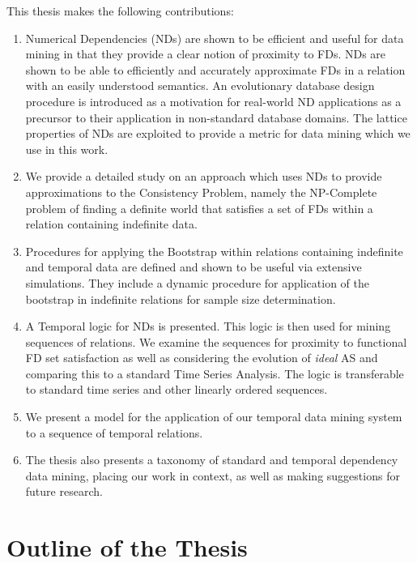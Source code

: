 This thesis makes the following contributions:
\begin{enumerate}
\item Numerical Dependencies (NDs) are shown to be efficient and useful for 
data mining in that they provide a clear notion of proximity to FDs.
NDs are shown to be able to efficiently and accurately approximate FDs
in a relation with an easily understood semantics. 
An evolutionary database design procedure is introduced as a 
motivation for real-world ND applications as a precursor to their application
in non-standard database domains. The lattice properties of NDs are
exploited to provide a metric for data mining which we use in this work. 
\item We provide a detailed study on an approach which uses NDs to
provide approximations to the Consistency Problem, namely the
NP-Complete problem of finding a definite world that satisfies a set
of FDs within a relation containing indefinite data. 
\item Procedures for applying the Bootstrap within relations containing
indefinite and temporal data are defined and shown to be useful via extensive
simulations. They include a dynamic procedure for application of the
bootstrap in indefinite relations for sample size determination. 
\item A Temporal logic for NDs is presented. This logic is then used
for mining sequences of relations. We examine the sequences for proximity
to functional FD set satisfaction as well as considering the evolution
of {\em ideal} AS and comparing this to a standard Time Series
Analysis. The logic is transferable to standard time series and other
linearly ordered sequences.
\item We present a model for the application of our temporal data
mining system to a sequence of temporal relations.
\item The thesis also presents a taxonomy of standard and temporal 
dependency data mining, 
placing our work in context, as well as making suggestions for future research.
\end{enumerate}




\section{Outline of the Thesis}\label{sec:int_outline}

